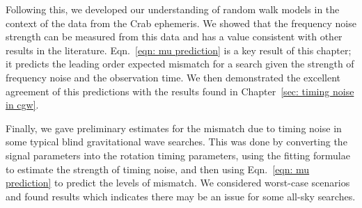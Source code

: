 \documentclass[../full_thesis/full_thesis.tex]{subfiles}
\begin{document}
{Following this, we developed our understanding of random walk models in the
context of the data from the Crab ephemeris. We showed that the frequency noise
strength can be measured from this data and has a value consistent with other
results in the literature. Eqn.~\eqref{eqn: mu prediction} is a key result of
this chapter; it predicts the leading order expected mismatch for a search
given the strength of frequency noise and the observation time. We then
demonstrated the excellent agreement of this predictions with the results
found in Chapter~\ref{sec: timing noise in cgw}.

Finally, we gave preliminary estimates for the mismatch due to timing noise
in some typical blind gravitational wave searches. This was done by converting
the signal parameters into the rotation timing parameters, using the \citet{Dewey1989}
fitting formulae to estimate the strength of timing noise, and then using
Eqn.~\eqref{eqn: mu prediction} to predict the levels of mismatch. We
considered worst-case scenarios and found results which indicates there may be
an issue for some all-sky searches.

}
\end{document}
